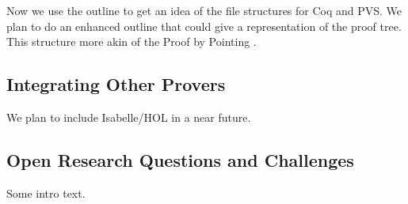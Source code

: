 \documentclass{entcs}
\begin{document}
Now we use the outline to get an idea of the file structures for Coq and PVS.
We plan to do an enhanced outline that could give a representation
of the proof tree. This structure more akin of the Proof by Pointing \cite{bertot94proof}.
\subsection{Integrating Other Provers}
\label{subsec:integr-other-prov}

We plan to include Isabelle/HOL in a near future.

\subsection{Open Research Questions and Challenges}
\label{subsec:open-rese-quest}

Some intro text.



%


\end{document}
